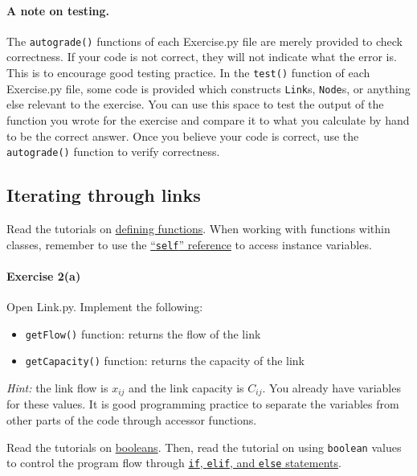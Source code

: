 \documentclass[11pt]{article}
\begin{document}
	
	\paragraph*{A note on testing.} The \texttt{autograde()} functions of each Exercise.py file are merely provided to check correctness. If your code is not correct, they will not indicate what the error is. This is to encourage good testing practice. In the \texttt{test()} function of each Exercise.py file, some code is provided which constructs \texttt{Link}s, \texttt{Node}s, or anything else relevant to the exercise. You can use this space to test the output of the function you wrote for the exercise and compare it to what you calculate by hand to be the correct answer. Once you believe your code is correct, use the \texttt{autograde()} function to verify correctness.
	
	
	
\subsection{Iterating through links}
\label{sec22}	
	
Read the tutorials on \href{https://www.w3schools.com/python/python_functions.asp}{defining functions}.  When working with functions within classes, remember to use the \href{https://www.w3schools.com/python/gloss_python_self.asp}{``\texttt{self}'' reference} to access instance variables.
	
\paragraph*{Exercise 2(a)} Open Link.py. 
Implement the following:
\begin{itemize}
\item \texttt{getFlow()} function: returns the flow of the link

\item \texttt{getCapacity()} function: returns the capacity of the link
\end{itemize}
\textit{Hint:} the link flow is $x_{ij}$ and the link capacity is $C_{ij}$. You already have variables for these values. It is good programming practice to separate the variables from other parts of the code through accessor functions. 

\vspace{\baselineskip}

\noindent
Read the tutorials on \href{https://www.w3schools.com/python/python_booleans.asp}{booleans}. Then, read the tutorial on using \texttt{boolean} values to control the program flow through \href{https://www.w3schools.com/python/python_conditions.asp}{\texttt{if}, \texttt{elif}, and \texttt{else} statements}. 
\end{document}
